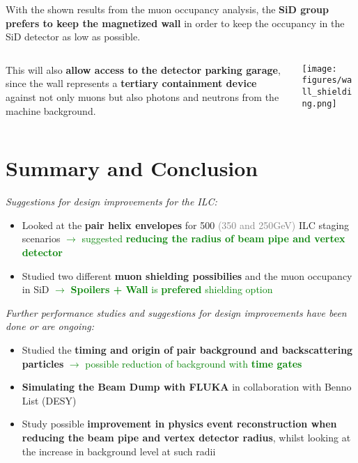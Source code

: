 \documentclass[xcolor={dvipsnames}]{beamer}
\begin{document}
\begin{frame}
 With the shown results from the muon occupancy analysis, the \textbf{SiD group prefers to keep the magnetized wall} in order to keep the occupancy in the SiD detector as low as possible.\\
 \vspace*{0.5cm}
 \begin{columns}
  \begin{column}{0.4\textwidth}
    This will also \textbf{allow access to the detector parking garage}, since the wall represents a \textbf{tertiary containment device} against not only muons but also photons and neutrons from the machine background.
  \end{column}
  \begin{column}{0.6\textwidth}
    \texttt{[image: figures/wall\_shielding.png]}
  \end{column}
 \end{columns}
\end{frame}

\section{Summary and Conclusion}
\begin{frame}
\textit{Suggestions for design improvements for the ILC:}
 \begin{itemize} 
  \item Looked at the \textbf{pair helix envelopes} for 500 \textcolor{Gray}{(350 and 250GeV)} ILC staging scenarios \textcolor{Green}{$\rightarrow$ suggested \textbf{reducing the radius of beam pipe and vertex detector}}
  \item Studied two different \textbf{muon shielding possibilies} and the muon occupancy in SiD \textcolor{Green}{$\rightarrow$ \textbf{Spoilers + Wall} is \textbf{prefered} shielding option}
 \end{itemize}
\textit{Further performance studies and suggestions for design improvements have been done or are ongoing:}
 \begin{itemize}
  \item Studied the \textbf{timing and origin of pair background and backscattering particles} \textcolor{Green}{$\rightarrow$ possible reduction of background with \textbf{time gates}}
  \item \textbf{Simulating the Beam Dump with FLUKA} in collaboration with Benno List (DESY)
  \item Study possible \textbf{improvement in physics event reconstruction when reducing the beam pipe and vertex detector radius}, whilst looking at the increase in background level at such radii
 \end{itemize}
\end{frame}
\end{document}
